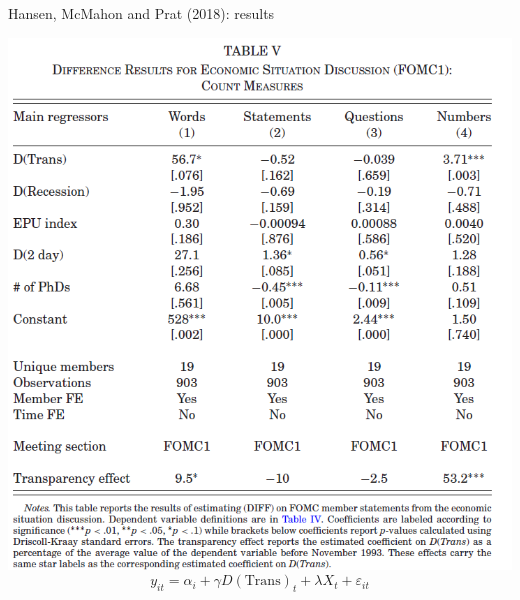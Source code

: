 \documentclass[english]{beamer}
\begin{document}
\begin{frame}{\small{Hansen, McMahon and Prat (2018): results}}
\vspace{-7pt}
\begin{center}
\includegraphics[scale=0.37]{Images/hansen2018d.png}
$$y_{i t}=\alpha_{i}+\gamma D(\text {Trans})_{t}+\lambda X_{t}+\varepsilon_{i t}$$
\end{center}
\end{frame}
\end{document}
